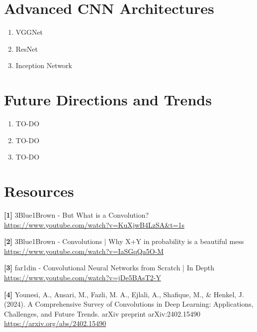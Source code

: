 \documentclass{article}
\begin{document}
\section{Advanced CNN Architectures}
    \begin{enumerate}[label=(\alph*)]
        \item VGGNet
        \item ResNet
        \item Inception Network
    \end{enumerate}
    
\section{Future Directions and Trends}
    \begin{enumerate}[label=(\alph*)]
        \item TO-DO
        \item TO-DO
        \item TO-DO
    \end{enumerate}

\section{Resources}
    \textbf{[1]} 3Blue1Brown - But What is a Convolution? \\
    \url{https://www.youtube.com/watch?v=KuXjwB4LzSA&t=1s}
    
    \textbf{[2]} 3Blue1Brown - Convolutions | Why X+Y in probability is a beautiful mess \\
    \url{https://www.youtube.com/watch?v=IaSGqQa5O-M}
    
    \textbf{[3]} far1din - Convolutional Neural Networks from Scratch | In Depth \\
    \url{https://www.youtube.com/watch?v=jDe5BAsT2-Y}
    
    \textbf{[4]} Younesi, A., Ansari, M., Fazli, M. A., Ejlali, A., Shafique, M., \& Henkel, J. (2024). A Comprehensive Survey of Convolutions in Deep Learning: Applications, Challenges, and Future Trends. arXiv preprint arXiv:2402.15490 \\
    \url{https://arxiv.org/abs/2402.15490}
\end{document}
